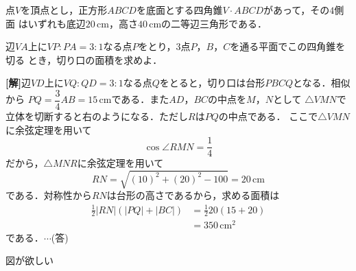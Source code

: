 \documentclass[a4j]{jarticle}
\begin{document}

     \begin{oframed}
     点$V$を頂点とし，正方形$ABCD$を底面とする四角錐$V\cdot ABCD$があって，その$4$側面
     はいずれも底辺$20 \,\mathrm{cm}$，高さ$40\,\mathrm{cm}$の二等辺三角形である．
     
     辺$VA$上に$VP:PA=3:1$なる点$P$をとり，$3$点$P$，$B$，$C$を通る平面でこの四角錐を切る
     とき，切り口の面積を求めよ．
     \end{oframed}

\setlength{\columnseprule}{0.4pt}
\begin{multicols}{2}
{\bf[解]}辺$VD$上に$VQ:QD=3:1$なる点$Q$をとると，切り口は台形$PBCQ$となる．相似から
$PQ=\dfrac{3}{4}AB=15 \,\mathrm{cm}$である．また$AD$，$BC$の中点を$M$，$N$として
$\triangle VMN$で立体を切断すると右のようになる．ただし$R$は$PQ$の中点である．
ここで$\triangle VMN$に余弦定理を用いて
     \[\cos \angle RMN=\frac{1}{4}\]
だから，$\triangle MNR$に余弦定理を用いて
     \[RN=\sqrt{(10)^2+(20)^2-100}=20 \,\mathrm{cm}\]
である．対称性から$RN$は台形の高さであるから，求める面積は
     \begin{align*}
     \frac{1}{2}|RN|(|PQ|+|BC|)&=\frac{1}{2}20(15+20) \\
     &=350 \,\mathrm{cm^2}
     \end{align*}
である．$\cdots$(答)


図が欲しい
\newpage
\end{multicols}
\end{document}

